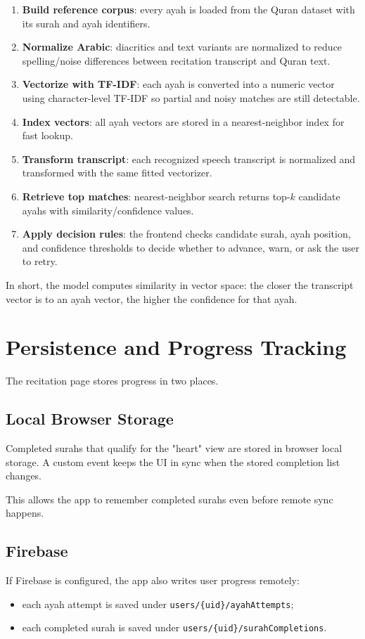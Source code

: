 \documentclass[11pt,a4paper]{article}
\begin{document}
\begin{enumerate}
  \item \textbf{Build reference corpus}: every ayah is loaded from the Quran dataset with its surah and ayah identifiers.
  \item \textbf{Normalize Arabic}: diacritics and text variants are normalized to reduce spelling/noise differences between recitation transcript and Quran text.
  \item \textbf{Vectorize with TF-IDF}: each ayah is converted into a numeric vector using character-level TF-IDF so partial and noisy matches are still detectable.
  \item \textbf{Index vectors}: all ayah vectors are stored in a nearest-neighbor index for fast lookup.
  \item \textbf{Transform transcript}: each recognized speech transcript is normalized and transformed with the same fitted vectorizer.
  \item \textbf{Retrieve top matches}: nearest-neighbor search returns top-$k$ candidate ayahs with similarity/confidence values.
  \item \textbf{Apply decision rules}: the frontend checks candidate surah, ayah position, and confidence thresholds to decide whether to advance, warn, or ask the user to retry.
\end{enumerate}

In short, the model computes similarity in vector space: the closer the transcript vector is to an ayah vector, the higher the confidence for that ayah.

\section{Persistence and Progress Tracking}
The recitation page stores progress in two places.

\subsection{Local Browser Storage}
Completed surahs that qualify for the "heart" view are stored in browser local storage. A custom event keeps the UI in sync when the stored completion list changes.

This allows the app to remember completed surahs even before remote sync happens.

\subsection{Firebase}
If Firebase is configured, the app also writes user progress remotely:
\begin{itemize}
  \item each ayah attempt is saved under \texttt{users/\{uid\}/ayahAttempts};
  \item each completed surah is saved under \texttt{users/\{uid\}/surahCompletions}.
\end{itemize}
\end{document}
